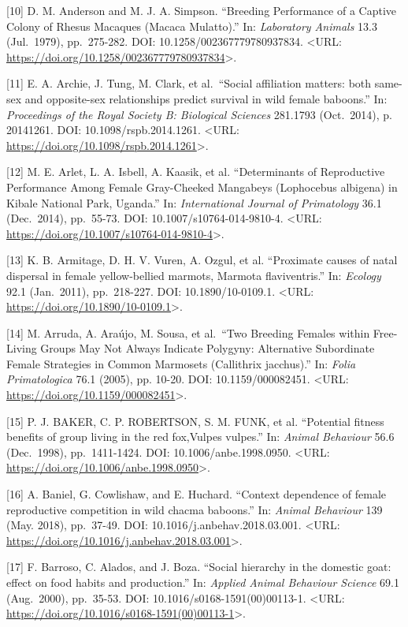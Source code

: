 \documentclass[
]{article}
\begin{document}
{[}10{]} D. M. Anderson and M. J. A. Simpson. ``Breeding Performance of
a Captive Colony of Rhesus Macaques (Macaca Mulatto).'' In:
\emph{Laboratory Animals} 13.3 (Jul.~1979), pp.~275-282. DOI:
10.1258/002367779780937834. \textless URL:
\url{https://doi.org/10.1258/002367779780937834}\textgreater.

{[}11{]} E. A. Archie, J. Tung, M. Clark, et al.~``Social affiliation
matters: both same-sex and opposite-sex relationships predict survival
in wild female baboons.'' In: \emph{Proceedings of the Royal Society B:
Biological Sciences} 281.1793 (Oct.~2014), p. 20141261. DOI:
10.1098/rspb.2014.1261. \textless URL:
\url{https://doi.org/10.1098/rspb.2014.1261}\textgreater.

{[}12{]} M. E. Arlet, L. A. Isbell, A. Kaasik, et al. ``Determinants of
Reproductive Performance Among Female Gray-Cheeked Mangabeys (Lophocebus
albigena) in Kibale National Park, Uganda.'' In: \emph{International
Journal of Primatology} 36.1 (Dec.~2014), pp.~55-73. DOI:
10.1007/s10764-014-9810-4. \textless URL:
\url{https://doi.org/10.1007/s10764-014-9810-4}\textgreater.

{[}13{]} K. B. Armitage, D. H. V. Vuren, A. Ozgul, et al. ``Proximate
causes of natal dispersal in female yellow-bellied marmots, Marmota
flaviventris.'' In: \emph{Ecology} 92.1 (Jan.~2011), pp.~218-227. DOI:
10.1890/10-0109.1. \textless URL:
\url{https://doi.org/10.1890/10-0109.1}\textgreater.

{[}14{]} M. Arruda, A. Araújo, M. Sousa, et al.~``Two Breeding Females
within Free-Living Groups May Not Always Indicate Polygyny: Alternative
Subordinate Female Strategies in Common Marmosets (Callithrix
jacchus).'' In: \emph{Folia Primatologica} 76.1 (2005), pp. 10-20. DOI:
10.1159/000082451. \textless URL:
\url{https://doi.org/10.1159/000082451}\textgreater.

{[}15{]} P. J. BAKER, C. P. ROBERTSON, S. M. FUNK, et al. ``Potential
fitness benefits of group living in the red fox,Vulpes vulpes.'' In:
\emph{Animal Behaviour} 56.6 (Dec.~1998), pp.~1411-1424. DOI:
10.1006/anbe.1998.0950. \textless URL:
\url{https://doi.org/10.1006/anbe.1998.0950}\textgreater.

{[}16{]} A. Baniel, G. Cowlishaw, and E. Huchard. ``Context dependence
of female reproductive competition in wild chacma baboons.'' In:
\emph{Animal Behaviour} 139 (May. 2018), pp.~37-49. DOI:
10.1016/j.anbehav.2018.03.001. \textless URL:
\url{https://doi.org/10.1016/j.anbehav.2018.03.001}\textgreater.

{[}17{]} F. Barroso, C. Alados, and J. Boza. ``Social hierarchy in the
domestic goat: effect on food habits and production.'' In: \emph{Applied
Animal Behaviour Science} 69.1 (Aug.~2000), pp.~35-53. DOI:
10.1016/s0168-1591(00)00113-1. \textless URL:
\url{https://doi.org/10.1016/s0168-1591(00)00113-1}\textgreater.
\end{document}
